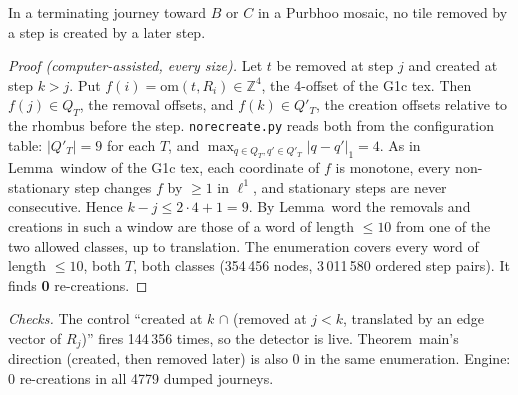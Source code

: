 \documentclass[11pt]{article}
\theoremstyle{definition}\newtheorem{definition}[theorem]{Definition}\newtheorem{remark}[theorem]{Remark}
\newcommand{\Z}{\mathbb Z}
\begin{document}
\begin{lemma}[no re-creation]\label{lem:nr}
In a terminating journey toward $B$ or $C$ in a Purbhoo mosaic, no tile removed by a step is created by a later step.
\end{lemma}
\begin{proof}[Proof (computer-assisted, every size)]
Let $t$ be removed at step $j$ and created at step $k>j$. Put $f(i)=\mathrm{om}(t,R_i)\in\Z^4$, the 4-offset of the G1c tex. Then $f(j)\in Q_T$, the removal offsets, and $f(k)\in Q'_T$, the creation offsets relative to the rhombus before the step.
\texttt{norecreate.py} reads both from the configuration table: $|Q'_T|=9$ for each $T$, and $\max_{q\in Q_T,q'\in Q'_T}|q-q'|_1=4$.
As in Lemma~window of the G1c tex, each coordinate of $f$ is monotone, every non-stationary step changes $f$ by $\ge1$ in $\ell^1$, and stationary steps are never consecutive. Hence $k-j\le2\cdot4+1=9$.
By Lemma~word the removals and creations in such a window are those of a word of length $\le10$ from one of the two allowed classes, up to translation. The enumeration covers every word of length $\le10$, both $T$, both classes (354\,456 nodes, 3\,011\,580 ordered step pairs). It finds \textbf{0} re-creations.
\end{proof}
\noindent\emph{Checks.} The control ``created at $k$ $\cap$ (removed at $j<k$, translated by an edge vector of $R_j$)'' fires 144\,356 times, so the detector is live. Theorem~main's direction (created, then removed later) is also 0 in the same enumeration. Engine: 0 re-creations in all 4779 dumped journeys.
\end{document}

